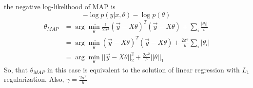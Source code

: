 \begin{answer}
the negative log-likelihood of MAP is $$-\log p(y|x,\theta) - \log p(\theta)$$
\begin{align*}
    \theta_{MAP} &= \arg\min\limits_\theta \frac{1}{2\sigma^2}(\vec{y}-X\theta)^T (\vec{y}-X\theta) + \sum\limits_i \frac{|\theta_i|}{b}\\
    &= \arg\min\limits_\theta (\vec{y}-X\theta)^T (\vec{y}-X\theta) + \frac{2\sigma^2}{b}\sum\limits_i |\theta_i|\\
    &= \arg\min\limits_\theta ||\vec{y}-X\theta||_2^2 + \frac{2\sigma^2}{b} ||\theta||_1
\end{align*}
So, that $\theta_{MAP}$ in this case is equivalent to the solution of linear regression with $L_1$ regularization. Also, $\gamma = \frac{2\sigma^2}{b}$
\end{answer}
